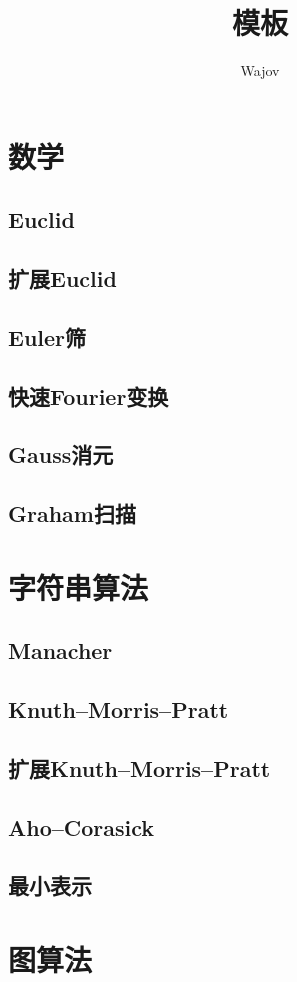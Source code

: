 \documentclass[a4paper]{article}
\title{模板}
\author{Wajov}
\begin{document}
\maketitle
\tableofcontents
\newpage
\section{数学}
\subsection{Euclid}
\subsection{扩展Euclid}
\subsection{Euler筛}
\subsection{快速Fourier变换}
\subsection{Gauss消元}
\subsection{Graham扫描}
\section{字符串算法}
\subsection{Manacher}
\subsection{Knuth–Morris–Pratt}
\subsection{扩展Knuth–Morris–Pratt}
\subsection{Aho–Corasick}
\subsection{最小表示}
\section{图算法}
\end{document}

